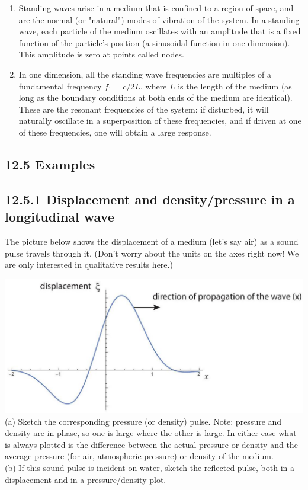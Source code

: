 \documentclass[10pt]{article}
\begin{document}
\begin{enumerate}
  \item Standing waves arise in a medium that is confined to a region of space, and are the normal (or "natural") modes of vibration of the system. In a standing wave, each particle of the medium oscillates with an amplitude that is a fixed function of the particle's position (a sinusoidal function in one dimension). This amplitude is zero at points called nodes.
  \item In one dimension, all the standing wave frequencies are multiples of a fundamental frequency $f_{1}=c / 2 L$, where $L$ is the length of the medium (as long as the boundary conditions at both ends of the medium are identical). These are the resonant frequencies of the system: if disturbed, it will naturally oscillate in a superposition of these frequencies, and if driven at one of these frequencies, one will obtain a large response.
\end{enumerate}

\subsection*{12.5 Examples}
\subsection*{12.5.1 Displacement and density/pressure in a longitudinal wave}
The picture below shows the displacement of a medium (let's say air) as a sound pulse travels through it. (Don't worry about the units on the axes right now! We are only interested in qualitative results here.)

\includegraphics[max width=\textwidth, center]{2024_09_14_9969b06773f10b6936e8g-313}\\
(a) Sketch the corresponding pressure (or density) pulse. Note: pressure and density are in phase, so one is large where the other is large. In either case what is always plotted is the difference between the actual pressure or density and the average pressure (for air, atmospheric pressure) or density of the medium.\\
(b) If this sound pulse is incident on water, sketch the reflected pulse, both in a displacement and in a pressure/density plot.
\end{document}
